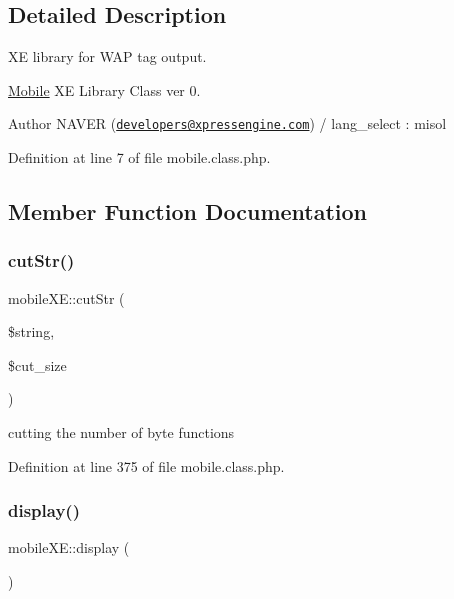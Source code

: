 \subsection{Detailed Description}
XE library for W\+AP tag output. 

\hyperlink{classMobile}{Mobile} XE Library Class ver 0. \begin{DoxyAuthor}{Author}
N\+A\+V\+ER (\href{mailto:developers@xpressengine.com}{\tt developers@xpressengine.\+com}) / lang\+\_\+select \+: misol 
\end{DoxyAuthor}


Definition at line 7 of file mobile.\+class.\+php.



\subsection{Member Function Documentation}
\hypertarget{classmobileXE_acd2dd9d14993324440b01d94be13e818}{}\label{classmobileXE_acd2dd9d14993324440b01d94be13e818} 
\subsubsection{\texorpdfstring{cut\+Str()}{cutStr()}}
{\footnotesize\ttfamily mobile\+X\+E\+::cut\+Str (\begin{DoxyParamCaption}\item[{}]{\$string,  }\item[{}]{\$cut\+\_\+size }\end{DoxyParamCaption})}



cutting the number of byte functions 



Definition at line 375 of file mobile.\+class.\+php.

\hypertarget{classmobileXE_aff665dae76909bd7876038802e4d001f}{}\label{classmobileXE_aff665dae76909bd7876038802e4d001f} 
\subsubsection{\texorpdfstring{display()}{display()}}
{\footnotesize\ttfamily mobile\+X\+E\+::display (\begin{DoxyParamCaption}{ }\end{DoxyParamCaption})}




